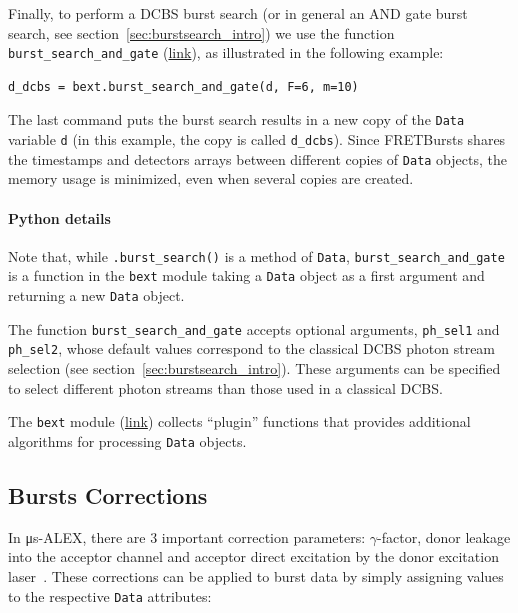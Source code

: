 \documentclass[10pt,letterpaper]{article}
\begin{document}
Finally, to perform a DCBS burst search (or in general an AND gate burst search,
see section~\ref{sec:burstsearch_intro}) we use the function
\verb|burst_search_and_gate|
(\href{http://fretbursts.readthedocs.org/en/latest/plugins.html#fretbursts.burstlib_ext.burst_search_and_gate}{link}),
as illustrated in the following example:

\begin{lstlisting}
d_dcbs = bext.burst_search_and_gate(d, F=6, m=10)
\end{lstlisting}

The last command puts the burst search results in a new copy of the \verb|Data| variable \verb|d|
(in this example, the copy is called \verb|d_dcbs|).
Since FRETBursts shares the timestamps and detectors arrays between
different copies of \verb|Data| objects, the memory usage is minimized, even when
several copies are created.

\paragraph{Python details}
Note that, while \verb|.burst_search()| is a method of \verb|Data|,
\verb|burst_search_and_gate| is a function in the \verb|bext| module
taking a \verb|Data| object as a first argument and returning a new
\verb|Data| object.

The function \verb|burst_search_and_gate| accepts optional arguments,
\verb|ph_sel1| and \verb|ph_sel2|, whose default values correspond to the
classical DCBS photon stream selection (see section~\ref{sec:burstsearch_intro}).
These arguments can be specified to select different photon streams than those used in
a classical DCBS.

The \verb|bext| module (\href{http://fretbursts.readthedocs.org/en/latest/plugins.html}{link})
collects ``plugin'' functions that provides additional algorithms
for processing \verb|Data| objects.

\subsection{Bursts Corrections}
\label{sec:corrcoeff}

In μs-ALEX, there are 3 important correction parameters: $\gamma$-factor, 
donor leakage into the acceptor channel
and acceptor direct excitation by the donor excitation laser~\cite{Lee_2005}.
These corrections can be applied to burst data by simply assigning values 
to the respective \verb|Data| attributes:
\end{document}
